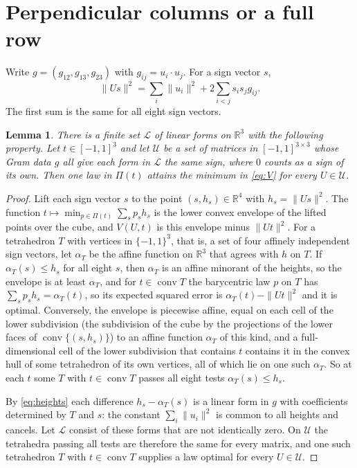 \documentclass[11pt]{amsart}
\newtheorem{lem}[thm]{Lemma}
\theoremstyle{remark}
\numberwithin{equation}{section}
\DeclareMathOperator{\conv}{conv}
\begin{document}
\section{Perpendicular columns or a full row}\label{sec:ext}

Write $g=(g_{12},g_{13},g_{23})$ with $g_{ij}=u_i\cdot u_j$. For a sign vector $s$,
\begin{equation}\label{eq:heights}
\|Us\|^2=\sum_i\|u_i\|^2+2\sum_{i<j}s_is_jg_{ij}.
\end{equation}
The first sum is the same for all eight sign vectors.

\begin{lem}\label{lem:cone}
There is a finite set $\mathcal L$ of linear forms on $\mathbb R^3$ with the following property. Let $t\in[-1,1]^3$ and let $\mathcal U$ be a set of matrices in $[-1,1]^{3\times3}$ whose Gram data $g$ all give each form in $\mathcal L$ the same sign, where $0$ counts as a sign of its own. Then one law in $\Pi(t)$ attains the minimum in \eqref{eq:V} for every $U\in\mathcal U$.
\end{lem}

\begin{proof}
Lift each sign vector $s$ to the point $(s,h_s)\in\mathbb R^4$ with $h_s=\|Us\|^2$. The function $t\mapsto\min_{p\in\Pi(t)}\sum_sp_sh_s$ is the lower convex envelope of the lifted points over the cube, and $V(U,t)$ is this envelope minus $\|Ut\|^2$. For a tetrahedron $T$ with vertices in $\{-1,1\}^3$, that is, a set of four affinely independent sign vectors, let $\alpha_T$ be the affine function on $\mathbb R^3$ that agrees with $h$ on $T$. If $\alpha_T(s)\le h_s$ for all eight $s$, then $\alpha_T$ is an affine minorant of the heights, so the envelope is at least $\alpha_T$, and for $t\in\conv T$ the barycentric law $p$ on $T$ has $\sum_sp_sh_s=\alpha_T(t)$, so its expected squared error is $\alpha_T(t)-\|Ut\|^2$ and it is optimal. Conversely, the envelope is piecewise affine, equal on each cell of the lower subdivision (the subdivision of the cube by the projections of the lower faces of $\conv\{(s,h_s)\}$) to an affine function $\alpha_T$ of this kind, and a full-dimensional cell of the lower subdivision that contains $t$ contains it in the convex hull of some tetrahedron of its own vertices, all of which lie on one such $\alpha_T$. So at each $t$ some $T$ with $t\in\conv T$ passes all eight tests $\alpha_T(s)\le h_s$.

By \eqref{eq:heights} each difference $h_s-\alpha_T(s)$ is a linear form in $g$ with coefficients determined by $T$ and $s$: the constant $\sum_i\|u_i\|^2$ is common to all heights and cancels. Let $\mathcal L$ consist of these forms that are not identically zero. On $\mathcal U$ the tetrahedra passing all tests are therefore the same for every matrix, and one such tetrahedron $T$ with $t\in\conv T$ supplies a law optimal for every $U\in\mathcal U$.
\end{proof}
\end{document}
